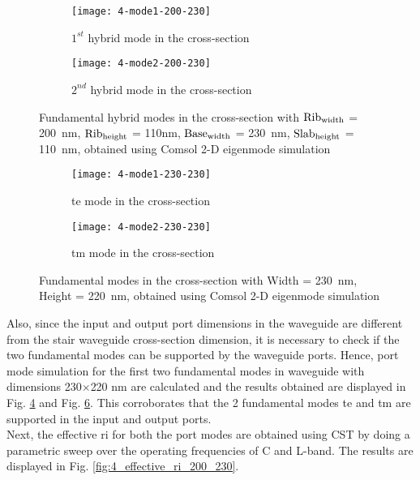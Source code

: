 \documentclass[../report.tex]{subfiles}
\begin{document}
\begin{figure}[H] %
	\begin{subfigure}[t]{0.45\textwidth}
		\texttt{[image: 4-mode1-200-230]}
		\caption{$1^{st}$ hybrid mode in the cross-section}
		\label{fig:4_mode1_200_230}
	\end{subfigure}
	\hfill
	\begin{subfigure}[t]{0.45\textwidth}
		\texttt{[image: 4-mode2-200-230]}
		\caption{$2^{nd}$ hybrid mode in the cross-section}
		\label{fig:4_mode2_200_230}
	\end{subfigure}
	\caption{Fundamental hybrid modes in the cross-section with $\mathrm{Rib_{width}}$ = \SI{200}{\nano \meter}, $\mathrm{Rib_{height}}$ = 110nm, $\mathrm{Base_{width}}$ = \SI{230}{\nano \meter}, $\mathrm{Slab_{height}}$ = \SI{110}{\nano \meter}, obtained using Comsol 2-D eigenmode simulation}
\end{figure}

\begin{figure}[H] %
	\begin{subfigure}[t]{0.45\textwidth}
		\texttt{[image: 4-mode1-230-230]}
		\caption{\gls{te} mode in the cross-section}
		\label{fig:4_mode1_230_230}
	\end{subfigure}
	\hfill
	\begin{subfigure}[t]{0.45\textwidth}
		\texttt{[image: 4-mode2-230-230]}
		\caption{\gls{tm} mode in the cross-section}
		\label{fig:4_mode2_230_230}
	\end{subfigure}
	\caption{Fundamental modes in the cross-section with Width = \SI{230}{\nano \meter}, Height = \SI{220}{\nano \meter}, obtained using Comsol 2-D eigenmode simulation}
\end{figure}

\noindent Also, since the input and output port dimensions in the waveguide are different from the stair waveguide cross-section dimension, it is necessary to check if the two fundamental modes can be supported by the waveguide ports. Hence, port mode simulation for the first two fundamental modes in waveguide with dimensions 230$\times$220 nm are calculated and the results obtained are displayed in Fig. \ref{fig:4_mode1_230_230} and Fig. \ref{fig:4_mode2_230_230}. This corroborates that the 2 fundamental modes \gls{te} and \gls{tm} are supported in the input and output ports.\\

\noindent Next, the effective \gls{ri} for both the port modes are obtained using CST by doing a parametric sweep over the operating frequencies of C and L-band. The results are displayed in Fig. \ref{fig:4_effective_ri_200_230}. 
\end{document}
